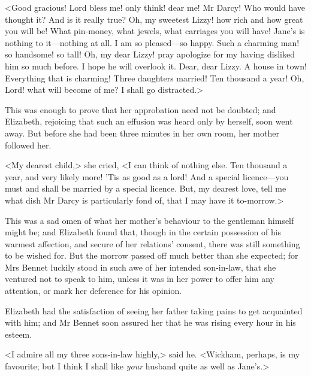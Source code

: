 <Good gracious! Lord bless me! only think! dear me! Mr Darcy! Who would have thought it? And is it really true? Oh, my sweetest Lizzy! how rich and how great you will be! What pin-money, what jewels, what carriages you will have! Jane's is nothing to it—nothing at all. I am so pleased—so happy. Such a charming man! so handsome! so tall! Oh, my dear Lizzy! pray apologize for my having disliked him so much before. I hope he will overlook it. Dear, dear Lizzy. A house in town! Everything that is charming! Three daughters married! Ten thousand a year! Oh, Lord! what will become of me? I shall go distracted.>

This was enough to prove that her approbation need not be doubted; and Elizabeth, rejoicing that such an effusion was heard only by herself, soon went away. But before she had been three minutes in her own room, her mother followed her.

<My dearest child,> she cried, <I can think of nothing else. Ten thousand a year, and very likely more! 'Tis as good as a lord! And a special licence—you must and shall be married by a special licence. But, my dearest love, tell me what dish Mr Darcy is particularly fond of, that I may have it to-morrow.>

This was a sad omen of what her mother's behaviour to the gentleman himself might be; and Elizabeth found that, though in the certain possession of his warmest affection, and secure of her relations' consent, there was still something to be wished for. But the morrow passed off much better than she expected; for Mrs Bennet luckily stood in such awe of her intended son-in-law, that she ventured not to speak to him, unless it was in her power to offer him any attention, or mark her deference for his opinion.

Elizabeth had the satisfaction of seeing her father taking pains to get acquainted with him; and Mr Bennet soon assured her that he was rising every hour in his esteem.

<I admire all my three sons-in-law highly,> said he. <Wickham, perhaps, is my favourite; but I think I shall like \textit{your} husband quite as well as Jane's.>